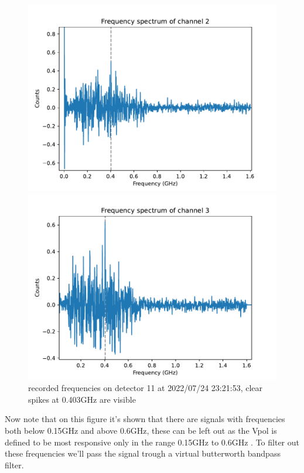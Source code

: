 \begin{figure}
	\begin{minipage}{0.49\textwidth}
		\includegraphics[width=\textwidth]{figures/2-freq.pdf}
	\end{minipage}
	\begin{minipage}{0.49\textwidth}
		\includegraphics[width=\textwidth]{figures/3-freq.pdf}
	\end{minipage}
	\caption{recorded frequencies on detector 11 at 2022/07/24 23:21:53, clear spikes at 0.403GHz are visible}
	\label{fig:freqs23}
\end{figure}
Now note that on this figure it's shown that there are signals with frequencies
both below 0.15GHz and above 0.6GHz, these can be left out as the Vpol is
defined to be most responsive only in the range 0.15GHz to 0.6GHz
\cite{Aguilar_2021}. To filter out these frequencies we'll pass the signal trough a virtual
butterworth bandpass filter.

